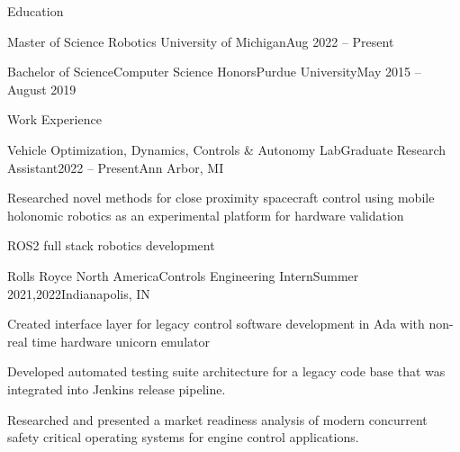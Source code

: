 \documentclass[]{jheidegger-resume}
\begin{document}
\resumeheader
{}
{}
{}
{}
{}

\begin{section}{Education}
    \begin{subsectionnobullet}{Master of Science}
    {Robotics}
    {University of Michigan}{Aug 2022 -- Present}
    \end{subsectionnobullet}
    
    \begin{subsectionnobullet}{Bachelor of Science}{Computer Science Honors}{Purdue University}{May 2015 -- August 2019}
    \end{subsectionnobullet}
\end{section}

\begin{section}{Work Experience}
    \begin{subsection}{Vehicle Optimization, Dynamics, Controls \& Autonomy Lab}{Graduate Research Assistant}{2022 -- Present}{Ann Arbor, MI}
        \item Researched novel methods for close proximity spacecraft control using mobile holonomic robotics as an experimental platform for hardware validation
        \item ROS2 full stack robotics development
    \end{subsection}
    
    \begin{subsection}{Rolls Royce North America}{Controls Engineering Intern}{Summer 2021,2022}{Indianapolis, IN}
        \item Created interface layer for legacy control software development in Ada with non-real time hardware unicorn emulator
        \item Developed automated testing suite architecture for a legacy code base that was integrated into Jenkins release pipeline.
        \item Researched and presented a market readiness analysis of modern concurrent safety critical operating systems for engine control applications. 
    \end{subsection}
    
\end{section}
\end{document}
